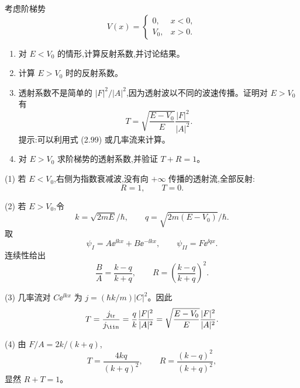 \begin{question}
考虑阶梯势
\[
V(x)=\begin{cases}0,&x<0,\\ V_0,&x>0.
\end{cases}
\]
\begin{enumerate}
\item 对 $E<V_0$ 的情形,计算反射系数,并讨论结果。
\item 计算 $E>V_0$ 时的反射系数。
\item 透射系数不是简单的 $|F|^2/|A|^2$,因为透射波以不同的波速传播。证明对 $E>V_0$ 有
\[
T=\sqrt{\frac{E-V_0}{E}}\frac{|F|^2}{|A|^2}.
\]
提示:可以利用式 (2.99) 或几率流来计算。
\item 对 $E>V_0$ 求阶梯势的透射系数,并验证 $T+R=1$。
\end{enumerate}

\par\smallskip
{}

\begin{solution}
(1) 若 $E<V_0$,右侧为指数衰减波,没有向 $+\infty$ 传播的透射流,全部反射:
\[
R=1,
\qquad T=0.
\]

(2) 若 $E>V_0$,令
\[
k=\sqrt{2mE}/\hbar,
\qquad
q=\sqrt{2m(E-V_0)}/\hbar.
\]
取
\[
\psi_I=A\ee^{\ii kx}+B\ee^{-\ii kx},
\qquad
\psi_{II}=F\ee^{\ii qx}.
\]
连续性给出
\[
\frac BA=\frac{k-q}{k+q},
\qquad
R=\left(\frac{k-q}{k+q}\right)^2.
\]

(3) 几率流对 $C\ee^{\ii kx}$ 为 $j=(\hbar k/m)|C|^2$。因此
\[
T=\frac{j_{\rm tr}}{j_{\rm \ii n}}
=\frac{q}{k}\frac{|F|^2}{|A|^2}
=\sqrt{\frac{E-V_0}{E}}\frac{|F|^2}{|A|^2}.
\]

(4) 由 $F/A=2k/(k+q)$,
\[
T=\frac{4kq}{(k+q)^2},
\qquad
R=\frac{(k-q)^2}{(k+q)^2},
\]
显然 $R+T=1$。
\end{solution}
\end{question}

